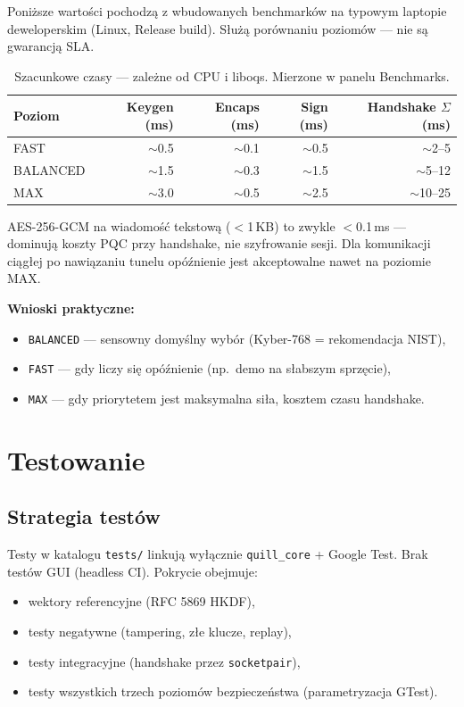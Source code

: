 \documentclass[12pt,a4paper]{article}
\begin{document}
Poniższe wartości pochodzą z wbudowanych benchmarków na typowym laptopie deweloperskim (Linux, Release build). Służą porównaniu poziomów --- nie są gwarancją SLA.

\begin{table}[H]
\centering
\small
\begin{tabular}{@{}lrrrr@{}}
\toprule
\textbf{Poziom} & \textbf{Keygen (ms)} & \textbf{Encaps (ms)} & \textbf{Sign (ms)} & \textbf{Handshake $\Sigma$ (ms)} \\
\midrule
FAST     & $\sim$0.5 & $\sim$0.1 & $\sim$0.5 & $\sim$2--5 \\
BALANCED & $\sim$1.5 & $\sim$0.3 & $\sim$1.5 & $\sim$5--12 \\
MAX      & $\sim$3.0 & $\sim$0.5 & $\sim$2.5 & $\sim$10--25 \\
\bottomrule
\end{tabular}
\caption{Szacunkowe czasy --- zależne od CPU i liboqs. Mierzone w panelu Benchmarks.}
\end{table}

AES-256-GCM na wiadomość tekstową ($<$1\,KB) to zwykle $<$0.1\,ms --- dominują koszty PQC przy handshake, nie szyfrowanie sesji. Dla komunikacji ciągłej po nawiązaniu tunelu opóźnienie jest akceptowalne nawet na poziomie MAX.

\textbf{Wnioski praktyczne:}
\begin{itemize}
    \item \texttt{BALANCED} --- sensowny domyślny wybór (Kyber-768 = rekomendacja NIST),
    \item \texttt{FAST} --- gdy liczy się opóźnienie (np.\ demo na słabszym sprzęcie),
    \item \texttt{MAX} --- gdy priorytetem jest maksymalna siła, kosztem czasu handshake.
\end{itemize}

\section{Testowanie}

\subsection{Strategia testów}

Testy w katalogu \texttt{tests/} linkują wyłącznie \texttt{quill\_core} + Google Test. Brak testów GUI (headless CI). Pokrycie obejmuje:
\begin{itemize}
    \item wektory referencyjne (RFC 5869 HKDF),
    \item testy negatywne (tampering, złe klucze, replay),
    \item testy integracyjne (handshake przez \texttt{socketpair}),
    \item testy wszystkich trzech poziomów bezpieczeństwa (parametryzacja GTest).
\end{itemize}
\end{document}
